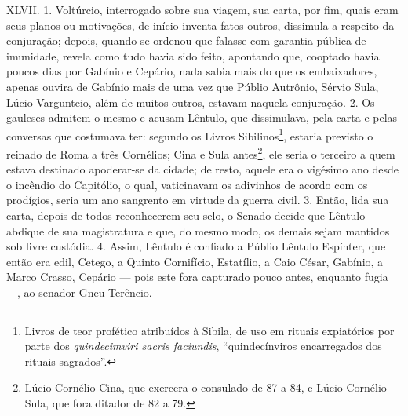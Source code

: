 XLVII. 1. Voltúrcio, interrogado sobre sua viagem, sua carta, por fim, quais
eram seus planos ou motivações, de início inventa fatos outros, dissimula a
respeito da conjuração; depois, quando se ordenou que falasse com garantia
pública de imunidade, revela como tudo havia sido feito, apontando que,
cooptado havia poucos dias por Gabínio e Cepário, nada sabia mais do que os
embaixadores, apenas ouvira de Gabínio mais de uma vez que Públio Autrônio,
Sérvio Sula, Lúcio Vargunteio, além de muitos outros, estavam naquela
conjuração. 2. Os gauleses admitem o mesmo e acusam Lêntulo, que dissimulava,
pela carta e pelas conversas que costumava ter: segundo os Livros
Sibilinos\footnote{Livros de teor profético atribuídos à Sibila, de  uso em
rituais expiatórios por parte dos \emph{quindecimviri sacris faciundis},
``quindecínviros encarregados dos rituais sagrados''.}, estaria previsto o
reinado de Roma a três Cornélios; Cina e Sula antes\footnote{Lúcio Cornélio
Cina, que exercera o consulado de 87 a 84, e Lúcio Cornélio Sula, que fora
ditador de 82 a 79.}, ele seria o terceiro a quem estava destinado apoderar-se
da cidade; de resto, aquele era o vigésimo ano desde o incêndio do Capitólio, o
qual, vaticinavam os adivinhos de acordo com os prodígios, seria um ano
sangrento em virtude da guerra civil. 3. Então, lida sua carta, depois de todos
reconhecerem seu selo, o Senado decide que Lêntulo abdique de sua magistratura
e que, do mesmo modo, os demais sejam mantidos sob livre custódia. 4. Assim,
Lêntulo é confiado a Públio Lêntulo Espínter, que então era edil, Cetego, a
Quinto Cornifício, Estatílio, a Caio César, Gabínio, a Marco Crasso, Cepário
--- pois este fora capturado pouco antes, enquanto fugia ---, ao senador Gneu
Terêncio.

